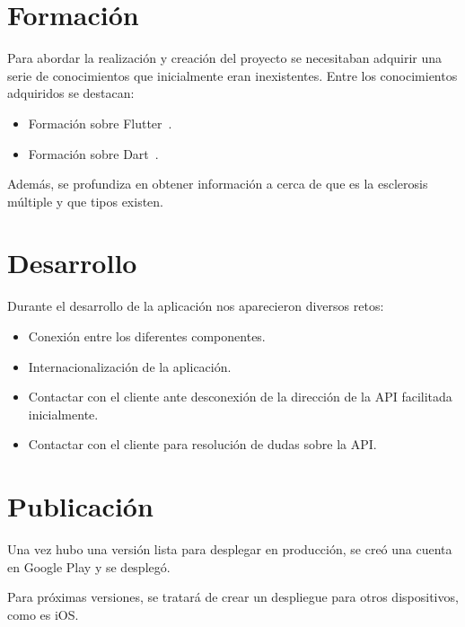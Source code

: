 \section{Formación}
Para abordar la realización y creación del proyecto se necesitaban adquirir una serie de conocimientos que inicialmente eran inexistentes. Entre los conocimientos adquiridos se destacan:
\begin{itemize}
\item Formación sobre Flutter~\cite{flutter,formacionFlutter}.
\item Formación sobre Dart~\cite{dart}.
\end{itemize}

Además, se profundiza en obtener información a cerca de que es la esclerosis múltiple y que tipos existen.

\section{Desarrollo}
Durante el desarrollo de la aplicación nos aparecieron diversos retos:
\begin{itemize}
\item Conexión entre los diferentes componentes.
\item Internacionalización de la aplicación.
\item Contactar con el cliente ante desconexión de la dirección de la API facilitada inicialmente.
\item Contactar con el cliente para resolución de dudas sobre la API.
\end{itemize}

\section{Publicación}
Una vez hubo una versión lista para desplegar en producción, se creó una cuenta en Google Play y se desplegó.

Para próximas versiones, se tratará de crear un despliegue para otros dispositivos, como es iOS.



